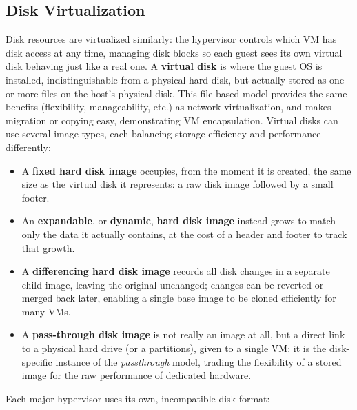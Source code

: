 \vspace{-1em}
 
\subsection{Disk Virtualization} \label{subsec:disk_virtualization}
 
Disk resources are virtualized similarly: the hypervisor controls which VM has disk access at any time, managing disk blocks so each guest sees its own virtual disk behaving just like a real one. A \textbf{virtual disk} is where the guest OS is installed, indistinguishable from a physical hard disk, but actually stored as one or more files on the host's physical disk. This file-based model provides the same benefits (flexibility, manageability, etc.) as network virtualization, and makes migration or copying easy, demonstrating VM encapsulation. Virtual disks can use several image types, each balancing storage efficiency and performance differently:
 
\begin{itemize}
    \item A \textbf{fixed hard disk image} occupies, from the moment it is created, the same size as the virtual disk it represents: a raw disk image followed by a small footer.
    \item An \textbf{expandable}, or \textbf{dynamic}, \textbf{hard disk image} instead grows to match only the data it actually contains, at the cost of a header and footer to track that growth.
    \item A \textbf{differencing hard disk image} records all disk changes in a separate child image, leaving the original unchanged; changes can be reverted or merged back later, enabling a single base image to be cloned efficiently for many VMs.
    \item A \textbf{pass-through disk image} is not really an image at all, but a direct link to a physical hard drive (or a partitions), given to a single VM: it is the disk-specific instance of the \textit{passthrough} model, trading the flexibility of a stored image for the raw performance of dedicated hardware.
\end{itemize}
 
Each major hypervisor uses its own, incompatible disk format:

\vspace{-0.5em}

